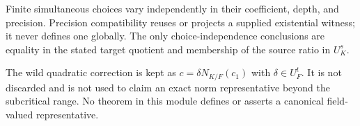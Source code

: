 \begin{lemma}
Finite simultaneous choices vary independently in their coefficient,
depth, and precision.  Precision compatibility reuses or projects a
supplied existential witness; it never defines one globally.  The only
choice-independence conclusions are equality in the stated target quotient
and membership of the source ratio in $U_K^s$.

The wild quadratic correction is kept as
$c=\delta N_{K/F}(c_1)$ with $\delta\in U_F^t$.  It is not discarded and is
not used to claim an exact norm representative beyond the subcritical
range.  No theorem in this module defines or asserts a canonical
field-valued representative.
\end{lemma}
